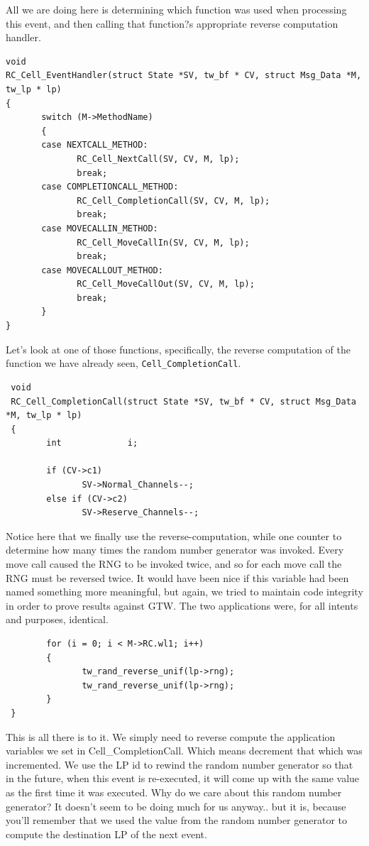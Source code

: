 \documentclass[12pt]{article}
\begin{document}
All we are doing here is determining which function was used when
processing this event, and then calling that function?s appropriate
reverse computation handler.
 
\begin{verbatim}
void
RC_Cell_EventHandler(struct State *SV, tw_bf * CV, struct Msg_Data *M, tw_lp * lp)
{
       switch (M->MethodName)
       {
       case NEXTCALL_METHOD:
              RC_Cell_NextCall(SV, CV, M, lp);
              break;
       case COMPLETIONCALL_METHOD:
              RC_Cell_CompletionCall(SV, CV, M, lp);
              break;
       case MOVECALLIN_METHOD:
              RC_Cell_MoveCallIn(SV, CV, M, lp);
              break;
       case MOVECALLOUT_METHOD:
              RC_Cell_MoveCallOut(SV, CV, M, lp);
              break;
       }
}
\end{verbatim}
 
Let's look at one of those functions, specifically, the reverse
computation of the function we have already seen, {\tt Cell\_CompletionCall}.

\begin{verbatim}
 void
 RC_Cell_CompletionCall(struct State *SV, tw_bf * CV, struct Msg_Data *M, tw_lp * lp)
 {
        int             i;

        if (CV->c1)
               SV->Normal_Channels--;
        else if (CV->c2)
               SV->Reserve_Channels--;
\end{verbatim}
 
Notice here that we finally use the reverse-computation, while one
counter to determine how many times the random number generator was
invoked.  Every move call caused the RNG to be invoked twice, and so
for each move call the RNG must be reversed twice.  It would have been
nice if this variable had been named something more meaningful, but
again, we tried to maintain code integrity in order to prove results
against GTW.  The two applications were, for all intents and purposes,
identical.

\begin{verbatim}
        for (i = 0; i < M->RC.wl1; i++)
        {
               tw_rand_reverse_unif(lp->rng);
               tw_rand_reverse_unif(lp->rng);
        }
 }
\end{verbatim}
 
This is all there is to it.  We simply need to reverse compute the
application variables we set in Cell\_CompletionCall.  Which means
decrement that which was incremented.  We use the LP id to rewind the
random number generator so that in the future, when this event is
re-executed, it will come up with the same value as the first time it
was executed.  Why do we care about this random number generator?  It
doesn't seem to be doing much for us anyway.. but it is, because
you'll remember that we used the value from the random number
generator to compute the destination LP of the next event.
 
\end{document}
